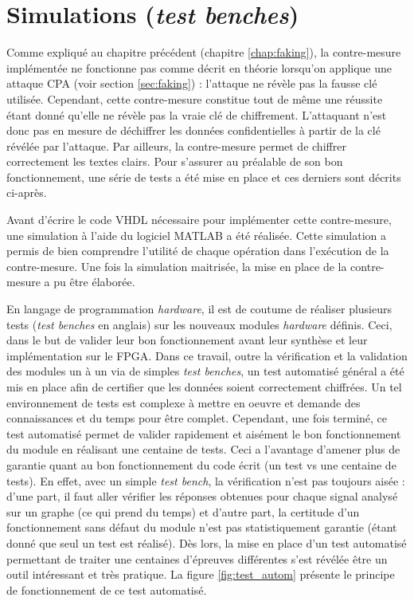 \documentclass[oneside]{book}
\begin{document}
\section{Simulations (\textit{test benches})}
\label{sec:EvalSim}

Comme expliqué au chapitre précédent (chapitre \ref{chap:faking}), la contre-mesure implémentée ne fonctionne pas comme décrit en théorie lorsqu'on applique une attaque CPA (voir section \ref{sec:faking}) : l'attaque ne révèle pas la fausse clé utilisée. Cependant, cette contre-mesure constitue tout de même une réussite étant donné qu'elle ne révèle pas la vraie clé de chiffrement. L'attaquant n'est donc pas en mesure de déchiffrer les données confidentielles à partir de la clé révélée par l'attaque. Par ailleurs, la contre-mesure permet de chiffrer correctement les textes clairs. Pour s'assurer au préalable de son bon fonctionnement, une série de tests a été mise en place et ces derniers sont décrits ci-après.

\hspace{-0.5cm}Avant d'écrire le code VHDL nécessaire pour implémenter cette contre-mesure, une simulation à l'aide du logiciel MATLAB a été réalisée. Cette simulation a permis de bien comprendre l'utilité de chaque opération dans l'exécution de la contre-mesure. Une fois la simulation maitrisée, la mise en place de la contre-mesure a pu être élaborée. 

\hspace{-0.5cm}En langage de programmation \textit{hardware}, il est de coutume de réaliser plusieurs tests (\textit{test benches} en anglais) sur les nouveaux modules \textit{hardware} définis. Ceci, dans le but de valider leur bon fonctionnement avant leur synthèse et leur implémentation sur le FPGA. Dans ce travail, outre la vérification et la validation des modules un à un via de simples \textit{test benches}, un test automatisé général a été mis en place afin de certifier que les données soient correctement chiffrées. Un tel environnement de tests est complexe à mettre en oeuvre et demande des connaissances et du temps pour être complet. Cependant, une fois terminé, ce test automatisé permet de valider rapidement et aisément le bon fonctionnement du module en réalisant une centaine de tests. Ceci a l'avantage d'amener plus de garantie quant au bon fonctionnement du code écrit (un test vs une centaine de tests). En effet, avec un simple \textit{test bench}, la vérification n'est pas toujours aisée : d'une part, il faut aller vérifier les réponses obtenues pour chaque signal analysé sur un graphe (ce qui prend du temps) et d'autre part, la certitude d'un fonctionnement sans défaut du module n'est pas statistiquement garantie (étant donné que seul un test est réalisé). Dès lors, la mise en place d'un test automatisé permettant de traiter une centaines d'épreuves différentes s'est révélée être un outil intéressant et très pratique. La figure \ref{fig:test_autom} présente le principe de fonctionnement de ce test automatisé.
\end{document}
